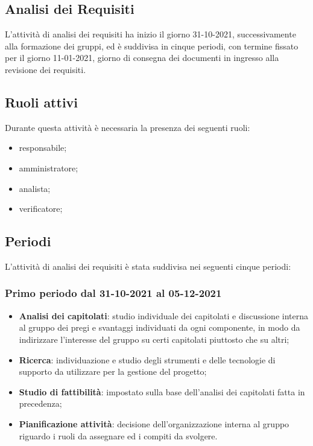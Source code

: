 \documentclass[]{article}
\begin{document}
	\subsection{Analisi dei Requisiti}
	L’attività di analisi dei requisiti ha inizio il giorno 31-10-2021, successivamente alla formazione dei
	gruppi, ed è suddivisa in cinque periodi, con termine fissato per il giorno 11-01-2021, giorno di consegna dei documenti in ingresso alla revisione dei requisiti.
	
	\subsection{Ruoli attivi}
	Durante questa attività è necessaria la presenza dei seguenti ruoli:
	\begin{itemize}
		\item responsabile;
		\item amministratore;
		\item analista;
		\item verificatore;
	\end{itemize}

	\subsection{Periodi}
	L’attività di analisi dei requisiti è stata suddivisa nei seguenti cinque periodi:
	
	\subsubsection{Primo periodo dal 31-10-2021 al 05-12-2021}
	\begin{itemize}
	\item \textbf{Analisi dei capitolati}: studio individuale dei capitolati e discussione interna al gruppo dei pregi e svantaggi individuati da ogni componente, in modo da indirizzare l’interesse del gruppo su certi capitolati piuttosto che su altri;
	\item \textbf{Ricerca}: individuazione e studio degli strumenti e delle tecnologie di supporto da utilizzare per
	la gestione del progetto;
	\item \textbf{Studio di fattibilità}: impostato sulla base dell’analisi dei capitolati fatta in precedenza;
	\item \textbf {Pianificazione attività}: decisione dell’organizzazione interna al gruppo riguardo i ruoli
	da assegnare ed i compiti da svolgere.
	\end{itemize}
	
\end{document}
